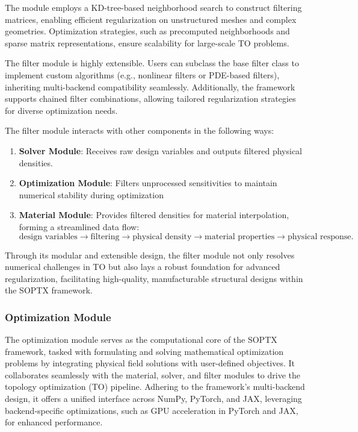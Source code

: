 \documentclass[mathpazo]{cicp}
\begin{document}
The module employs a KD-tree-based neighborhood search to construct filtering matrices, enabling efficient regularization on unstructured meshes and complex geometries. Optimization strategies, such as precomputed neighborhoods and sparse matrix representations, ensure scalability for large-scale TO problems.

The filter module is highly extensible. Users can subclass the base filter class to implement custom algorithms (e.g., nonlinear filters or PDE-based filters), inheriting multi-backend compatibility seamlessly. Additionally, the framework supports chained filter combinations, allowing tailored regularization strategies for diverse optimization needs.

The filter module interacts with other components in the following ways:
\begin{enumerate}
	\item \textbf{Solver Module}: Receives raw design variables and outputs filtered physical densities.
	\item \textbf{Optimization Module}: Filters unprocessed sensitivities to maintain numerical stability during optimization
	\item \textbf{Material Module}: Provides filtered densities for material interpolation, forming a streamlined data flow:
	\begin{equation*}
		\text{design variables} \to \text{filtering} \to \text{physical density} \to \text{material properties} \to \text{physical response}.
	\end{equation*}
\end{enumerate}

Through its modular and extensible design, the filter module not only resolves numerical challenges in TO but also lays a robust foundation for advanced regularization, facilitating high-quality, manufacturable structural designs within the SOPTX framework.

\subsubsection{Optimization Module}
The optimization module serves as the computational core of the SOPTX framework, tasked with formulating and solving mathematical optimization problems by integrating physical field solutions with user-defined objectives. It collaborates seamlessly with the material, solver, and filter modules to drive the topology optimization (TO) pipeline. Adhering to the framework’s multi-backend design, it offers a unified interface across NumPy, PyTorch, and JAX, leveraging backend-specific optimizations, such as GPU acceleration in PyTorch and JAX, for enhanced performance.
\end{document}
